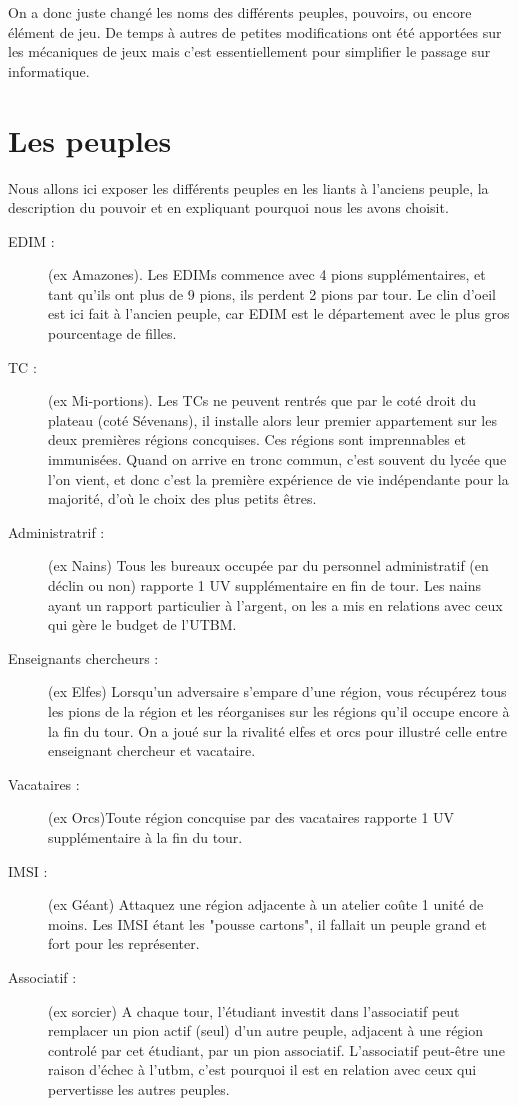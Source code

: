 \documentclass[11pt]{report}
\begin{document}
	On a donc juste changé les noms des différents peuples, pouvoirs, ou encore élément de jeu. De temps à autres de petites modifications ont été apportées sur les mécaniques de jeux mais c'est essentiellement pour simplifier le passage sur informatique.    

	\section{Les peuples}
	
	Nous allons ici exposer les différents peuples en les liants à l'anciens peuple, la description du pouvoir et en expliquant pourquoi nous les avons choisit.
	
	\begin{description}
		\item[EDIM :] (ex Amazones). Les EDIMs commence avec 4 pions supplémentaires, et tant qu'ils ont plus de 9 pions, ils perdent 2 pions par tour. Le clin d'oeil est ici fait à l'ancien peuple, car EDIM est le département avec le plus gros pourcentage de filles.
		\item[TC :] (ex Mi-portions). Les TCs ne peuvent rentrés que par le coté droit du plateau (coté Sévenans), il installe alors leur premier appartement sur les deux premières régions concquises. Ces régions sont imprennables et immunisées. Quand on arrive en tronc commun, c'est souvent du lycée que l'on vient, et donc c'est la première expérience de vie indépendante pour la majorité, d'où le choix des plus petits êtres.
		\item[Administratrif :] (ex Nains) Tous les bureaux occupée par du personnel administratif (en déclin ou non) rapporte 1 UV supplémentaire en fin de tour. Les nains ayant un rapport particulier à l'argent, on les a mis en relations avec ceux qui gère le budget de l'UTBM.
		\item[Enseignants chercheurs :] (ex Elfes) Lorsqu'un adversaire s'empare d'une région, vous récupérez tous les pions de la région et les réorganises sur les régions qu'il occupe encore à la fin du tour. On a joué sur la rivalité elfes et orcs pour illustré celle entre enseignant chercheur et vacataire.
		\item[Vacataires :] (ex Orcs)Toute région concquise par des vacataires rapporte 1 UV supplémentaire à la fin du tour.
		\item[IMSI :] (ex Géant) Attaquez une région adjacente à un atelier coûte 1 unité de moins. Les IMSI étant les "pousse cartons", il fallait un peuple grand et fort pour les représenter.
		\item[Associatif :] (ex sorcier) A chaque tour, l'étudiant investit dans l'associatif peut remplacer un pion actif (seul) d'un autre peuple, adjacent à une région controlé par cet étudiant, par un pion associatif. L'associatif peut-être une raison d'échec à l'utbm, c'est pourquoi il est en relation avec ceux qui pervertisse les autres peuples.

\end{description}
\end{document}
